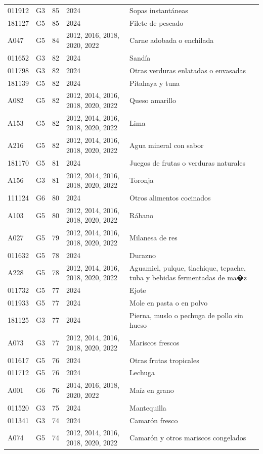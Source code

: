 \begin{table}[ht]
\begin{tabular}{llrll}
  011912 & G3 &  85 & 2024 & Sopas instantáneas \\ 
  181127 & G5 &  85 & 2024 & Filete de pescado \\ 
  A047 & G5 &  84 & 2012, 2016, 2018, 2020, 2022 & Carne adobada o enchilada \\ 
  011652 & G3 &  82 & 2024 & Sandía \\ 
  011798 & G3 &  82 & 2024 & Otras verduras enlatadas o envasadas \\ 
  181139 & G5 &  82 & 2024 & Pitahaya y tuna \\ 
  A082 & G5 &  82 & 2012, 2014, 2016, 2018, 2020, 2022 & Queso amarillo \\ 
  A153 & G5 &  82 & 2012, 2014, 2016, 2018, 2020, 2022 & Lima \\ 
  A216 & G5 &  82 & 2012, 2014, 2016, 2018, 2020, 2022 & Agua mineral con sabor \\ 
  181170 & G5 &  81 & 2024 & Juegos de frutas o verduras naturales \\ 
  A156 & G3 &  81 & 2012, 2014, 2016, 2018, 2020, 2022 & Toronja \\ 
  111124 & G6 &  80 & 2024 & Otros alimentos cocinados \\ 
  A103 & G5 &  80 & 2012, 2014, 2016, 2018, 2020, 2022 & Rábano \\ 
  A027 & G5 &  79 & 2012, 2014, 2016, 2018, 2020, 2022 & Milanesa de res \\ 
  011632 & G5 &  78 & 2024 & Durazno \\ 
  A228 & G5 &  78 & 2012, 2014, 2016, 2018, 2020, 2022 & Aguamiel, pulque, tlachique, tepache, tuba y bebidas fermentadas de ma�z \\ 
  011732 & G5 &  77 & 2024 & Ejote \\ 
  011933 & G5 &  77 & 2024 & Mole en pasta o en polvo \\ 
  181125 & G3 &  77 & 2024 & Pierna, muslo o pechuga de pollo sin hueso \\ 
  A073 & G3 &  77 & 2012, 2014, 2016, 2018, 2020, 2022 & Mariscos frescos \\ 
  011617 & G5 &  76 & 2024 & Otras frutas tropicales \\ 
  011712 & G5 &  76 & 2024 & Lechuga \\ 
  A001 & G6 &  76 & 2014, 2016, 2018, 2020, 2022 & Maíz en grano \\ 
  011520 & G3 &  75 & 2024 & Mantequilla \\ 
  011341 & G3 &  74 & 2024 & Camarón fresco \\ 
  A074 & G5 &  74 & 2012, 2014, 2016, 2018, 2020, 2022 & Camarón y otros mariscos congelados \\ 

\end{tabular}
\end{table}
